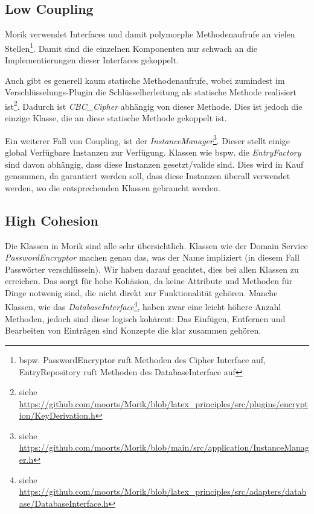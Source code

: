 \subsection{Low Coupling}

Morik verwendet Interfaces und damit polymorphe Methodenaufrufe an vielen Stellen\footnote{bspw. PasswordEncryptor ruft Methoden des Cipher Interface auf, EntryRepository ruft Methoden des DatabaseInterface auf}. Damit sind die einzelnen Komponenten nur schwach an die Implementierungen dieser Interfaces gekoppelt.

Auch gibt es generell kaum statische Methodenaufrufe, wobei zumindest im Verschlüsselungs-Plugin die Schlüsselherleitung als statische Methode realisiert ist\footnote{siehe \url{https://github.com/moorts/Morik/blob/latex_principles/src/plugins/encryption/KeyDerivation.h}}. Dadurch ist \textit{CBC\_Cipher} abhängig von dieser Methode. Dies ist jedoch die einzige Klasse, die an diese statische Methode gekoppelt ist.

Ein weiterer Fall von Coupling, ist der \textit{InstanceManager}\footnote{siehe \url{https://github.com/moorts/Morik/blob/main/src/application/InstanceManager.h}}. Dieser stellt einige global Verfügbare Instanzen zur Verfügung. Klassen wie bspw. die \textit{EntryFactory} sind davon abhängig, dass diese Instanzen gesetzt/valide sind. Dies wird in Kauf genommen, da garantiert werden soll, dass diese Instanzen überall verwendet werden, wo die entsprechenden Klassen gebraucht werden.

\subsection{High Cohesion}

Die Klassen in Morik sind alle sehr übersichtlich. Klassen wie der Domain Service \textit{PasswordEncryptor} machen genau das, was der Name impliziert (in diesem Fall Passwörter verschlüsseln). Wir haben darauf geachtet, dies bei allen Klassen zu erreichen. Das sorgt für hohe Kohäsion, da keine Attribute und Methoden für Dinge notwenig sind, die nicht direkt zur Funktionalität gehören. Manche Klassen, wie das \textit{DatabaseInterface}\footnote{siehe \url{https://github.com/moorts/Morik/blob/latex_principles/src/adapters/database/DatabaseInterface.h}}, haben zwar eine leicht höhere Anzahl Methoden, jedoch sind diese logisch kohärent: Das Einfügen, Entfernen und Bearbeiten von Einträgen sind Konzepte die klar zusammen gehören.
